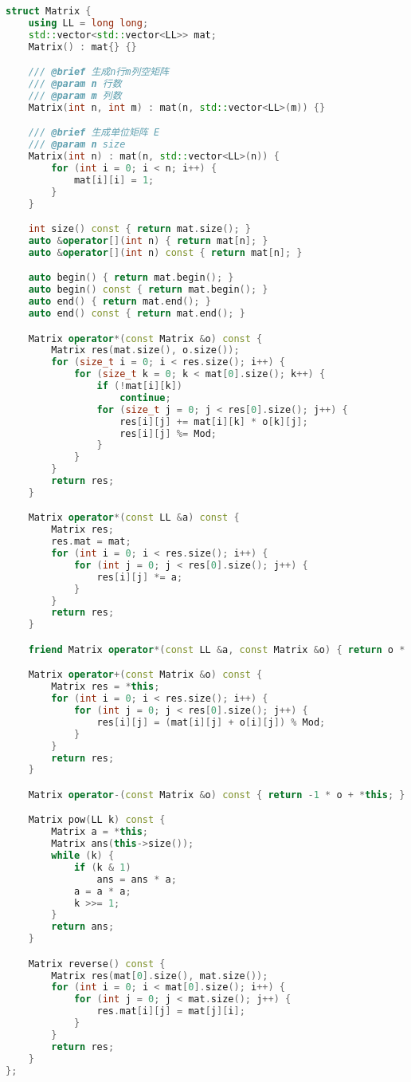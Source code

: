 \begin{lstlisting}[language=C++]
struct Matrix {
    using LL = long long;
    std::vector<std::vector<LL>> mat;
    Matrix() : mat{} {}

    /// @brief 生成n行m列空矩阵
    /// @param n 行数
    /// @param m 列数
    Matrix(int n, int m) : mat(n, std::vector<LL>(m)) {}

    /// @brief 生成单位矩阵 E
    /// @param n size
    Matrix(int n) : mat(n, std::vector<LL>(n)) {
        for (int i = 0; i < n; i++) {
            mat[i][i] = 1;
        }
    }

    int size() const { return mat.size(); }
    auto &operator[](int n) { return mat[n]; }
    auto &operator[](int n) const { return mat[n]; }

    auto begin() { return mat.begin(); }
    auto begin() const { return mat.begin(); }
    auto end() { return mat.end(); }
    auto end() const { return mat.end(); }

    Matrix operator*(const Matrix &o) const {
        Matrix res(mat.size(), o.size());
        for (size_t i = 0; i < res.size(); i++) {
            for (size_t k = 0; k < mat[0].size(); k++) {
                if (!mat[i][k])
                    continue;
                for (size_t j = 0; j < res[0].size(); j++) {
                    res[i][j] += mat[i][k] * o[k][j];
                    res[i][j] %= Mod;
                }
            }
        }
        return res;
    }

    Matrix operator*(const LL &a) const {
        Matrix res;
        res.mat = mat;
        for (int i = 0; i < res.size(); i++) {
            for (int j = 0; j < res[0].size(); j++) {
                res[i][j] *= a;
            }
        }
        return res;
    }

    friend Matrix operator*(const LL &a, const Matrix &o) { return o * a; }

    Matrix operator+(const Matrix &o) const {
        Matrix res = *this;
        for (int i = 0; i < res.size(); i++) {
            for (int j = 0; j < res[0].size(); j++) {
                res[i][j] = (mat[i][j] + o[i][j]) % Mod;
            }
        }
        return res;
    }

    Matrix operator-(const Matrix &o) const { return -1 * o + *this; }

    Matrix pow(LL k) const {
        Matrix a = *this;
        Matrix ans(this->size());
        while (k) {
            if (k & 1)
                ans = ans * a;
            a = a * a;
            k >>= 1;
        }
        return ans;
    }

    Matrix reverse() const {
        Matrix res(mat[0].size(), mat.size());
        for (int i = 0; i < mat[0].size(); i++) {
            for (int j = 0; j < mat.size(); j++) {
                res.mat[i][j] = mat[j][i];
            }
        }
        return res;
    }
};
\end{lstlisting}
